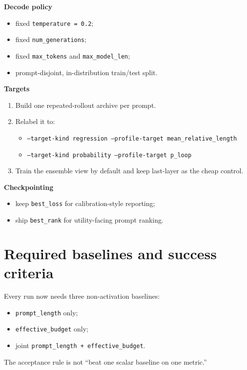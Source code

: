 \documentclass[11pt]{article}
\begin{document}
\textbf{Decode policy}
\begin{itemize}[leftmargin=1.5em]
\item fixed \texttt{temperature = 0.2};
\item fixed \texttt{num\_generations};
\item fixed \texttt{max\_tokens} and \texttt{max\_model\_len};
\item prompt-disjoint, in-distribution train/test split.
\end{itemize}

\textbf{Targets}
\begin{enumerate}[leftmargin=1.5em]
\item Build one repeated-rollout archive per prompt.
\item Relabel it to:
  \begin{itemize}[leftmargin=1.5em]
  \item \texttt{--target-kind regression --profile-target mean\_relative\_length}
  \item \texttt{--target-kind probability --profile-target p\_loop}
  \end{itemize}
\item Train the ensemble view by default and keep last-layer as the cheap control.
\end{enumerate}

\textbf{Checkpointing}
\begin{itemize}[leftmargin=1.5em]
\item keep \texttt{best\_loss} for calibration-style reporting;
\item ship \texttt{best\_rank} for utility-facing prompt ranking.
\end{itemize}

\section*{Required baselines and success criteria}
Every run now needs three non-activation baselines:
\begin{itemize}[leftmargin=1.5em]
\item \texttt{prompt\_length} only;
\item \texttt{effective\_budget} only;
\item joint \texttt{prompt\_length + effective\_budget}.
\end{itemize}

The acceptance rule is not ``beat one scalar baseline on one metric.''
\end{document}
